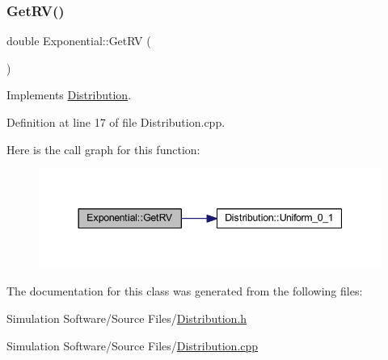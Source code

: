 \subsubsection{\texorpdfstring{Get\+R\+V()}{GetRV()}}
{\footnotesize\ttfamily double Exponential\+::\+Get\+RV (\begin{DoxyParamCaption}{ }\end{DoxyParamCaption})\hspace{0.3cm}{\ttfamily [virtual]}}



Implements \hyperlink{class_distribution_a63b433850d7b47d84eb69448f7916719}{Distribution}.



Definition at line 17 of file Distribution.\+cpp.

Here is the call graph for this function\+:
\nopagebreak
\begin{figure}[H]
\begin{center}
\leavevmode
\includegraphics[width=344pt]{class_exponential_a2a45aeaf0a3725174d86712761a8dd82_cgraph}
\end{center}
\end{figure}


The documentation for this class was generated from the following files\+:\begin{DoxyCompactItemize}
\item 
Simulation Software/\+Source Files/\hyperlink{_distribution_8h}{Distribution.\+h}\item 
Simulation Software/\+Source Files/\hyperlink{_distribution_8cpp}{Distribution.\+cpp}\end{DoxyCompactItemize}

